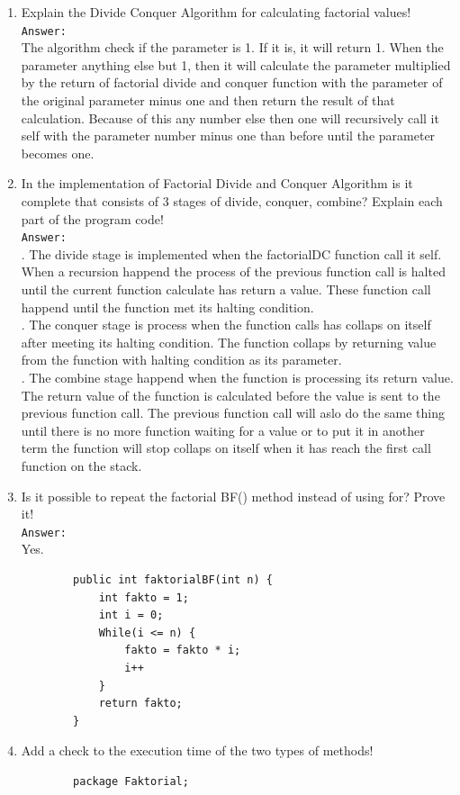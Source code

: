 \documentclass[12pt,titlepage]{article}
\begin{document}
\begin{enumerate}
    \item Explain the Divide Conquer Algorithm for calculating factorial values!
    \mbox{}\\
    \texttt{Answer: }
    \mbox{}\\
    The algorithm check if the parameter is 1. If it is, it will return 1. When the parameter anything else but 1, then it will calculate the parameter multiplied by the return of factorial divide and conquer function with the parameter of the original parameter minus one and then return the result of that calculation. Because of this any number else then one will recursively call it self with the parameter number minus one than before until the parameter becomes one.
    \item In the implementation of Factorial Divide and Conquer Algorithm is it complete that consists of 3 stages of divide, conquer, combine? Explain each part of the program code!
    \mbox{}\\
    \texttt{Answer: }
    \mbox{}\\ .
    \mbox{}
    The divide stage is implemented when the factorialDC function call it self. When a recursion happend the process of the previous function call is halted until the current function calculate has return a value. These function call happend until the function met its halting condition. 
    \mbox{}\\ .
    \mbox{}
    The conquer stage is process when the function calls has collaps on itself after meeting its halting condition. The function collaps by returning value from the function with halting condition as its parameter. 
    \mbox{}\\ .
    \mbox{}
    The combine stage happend when the function is processing its return value. The return value of the function is calculated before the value is sent to the previous function call. The previous function call will aslo do the same thing until there is no more function waiting for a value or to put it in another term the function will stop collaps on itself when it has reach the first call function on the stack.
    \item Is it possible to repeat the factorial BF() method instead of using for? Prove it!
    \mbox{}\\
    \texttt{Answer: }
    \mbox{}\\
    Yes.
    \begin{verbatim}
        public int faktorialBF(int n) {
            int fakto = 1;
            int i = 0;
            While(i <= n) {
                fakto = fakto * i;
                i++
            }
            return fakto;
        }
    \end{verbatim}
    \item Add a check to the execution time of the two types of methods!
    \begin{verbatim}
        package Faktorial;


\end{verbatim}
\end{enumerate}
\end{document}
